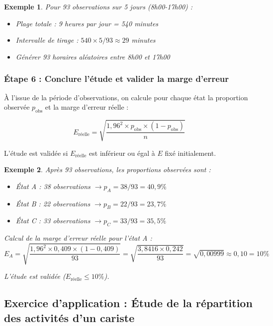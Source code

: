 \documentclass[a4paper,12pt]{article}
\newtheorem{exemple}{Exemple}[section]
\begin{document}
\begin{exemple}
Pour 93 observations sur 5 jours (8h00-17h00) :
\begin{itemize}
    \item Plage totale : 9 heures par jour = 540 minutes
    \item Intervalle de tirage : $540 \times 5 / 93 \approx 29$ minutes
    \item Générer 93 horaires aléatoires entre 8h00 et 17h00
\end{itemize}
\end{exemple}

\subsubsection{Étape 6 : Conclure l'étude et valider la marge d'erreur}

À l'issue de la période d'observations, on calcule pour chaque état la proportion observée $p_{\text{obs}}$ et la marge d'erreur réelle :

\[
E_{\text{réelle}} = \sqrt{\frac{1,96^2 \times p_{\text{obs}} \times (1-p_{\text{obs}})}{n}}
\]

L'étude est validée si $E_{\text{réelle}}$ est inférieur ou égal à $E$ fixé initialement.

\begin{exemple}
Après 93 observations, les proportions observées sont :
\begin{itemize}
    \item État A : 38 observations $\rightarrow p_A = 38/93 = 40,9\%$
    \item État B : 22 observations $\rightarrow p_B = 22/93 = 23,7\%$
    \item État C : 33 observations $\rightarrow p_C = 33/93 = 35,5\%$
\end{itemize}

Calcul de la marge d'erreur réelle pour l'état A :
\[
E_A = \sqrt{\frac{1,96^2 \times 0,409 \times (1-0,409)}{93}} = \sqrt{\frac{3,8416 \times 0,242}{93}} = \sqrt{0,00999} \approx 0,10 = 10\%
\]

L'étude est validée ($E_{\text{réelle}} \leq 10\%$).
\end{exemple}

\subsection{Exercice d'application : Étude de la répartition des activités d'un cariste}
\end{document}
